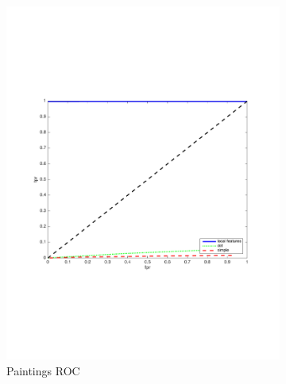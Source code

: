 \documentclass[english,12pt,a4paper,pdftex,elec,utf8, table]{aaltothesis}
\begin{document}
\begin{figure}[htb]
  \begin{center}
  \begin{subfigure}[b]{0.49\textwidth}
    \includegraphics[width=\textwidth]{figures/Border10ROC.pdf}
    \caption{Paintings ROC}
    \label{Borderroc}
  \end{subfigure}
  \begin{subfigure}[b]{0.49\textwidth}

\end{subfigure}
\end{center}
\end{figure}
\end{document}
